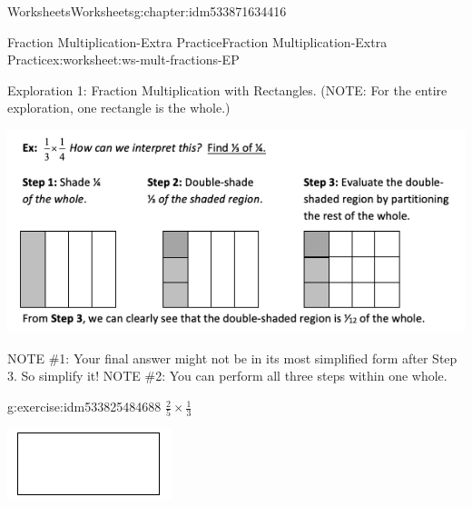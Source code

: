 \documentclass[twoside,11pt,]{book}
\begin{document}
\begin{chapterptx}{Worksheets}{}{Worksheets}{}{}{g:chapter:idm533871634416}
\typeout{************************************************}
%
\begin{worksheet-section-numberless}{Fraction Multiplication-Extra Practice}{}{Fraction Multiplication-Extra Practice}{}{}{x:worksheet:ws-mult-fractions-EP}
\begin{introduction}{}%
Exploration 1: Fraction Multiplication with Rectangles. (NOTE: For the entire exploration, one rectangle is the whole.)%
\begin{sidebyside}{1}{0}{0}{0}%
\begin{sbspanel}{1}%
\includegraphics[width=1\linewidth]{images/frac-mult-rect.png}
\end{sbspanel}%
\end{sidebyside}%
\par
NOTE \#1: Your final answer might not be in its most simplified form after Step 3. So simplify it! NOTE \#2: You can perform all three steps within one whole.%
\end{introduction}%
\begin{divisionexercise}{1}{}{}{g:exercise:idm533825484688}%
\(\frac{2}{5} \times \frac{1}{3} \)%
\begin{sidebyside}{1}{0.2}{0.2}{0}%
\begin{sbspanel}{0.6}%
\includegraphics[width=1\linewidth]{images/generic-rectangle.png}
\end{sbspanel}%

\end{sidebyside}
\end{divisionexercise}
\end{worksheet-section-numberless}
\end{chapterptx}
\end{document}
